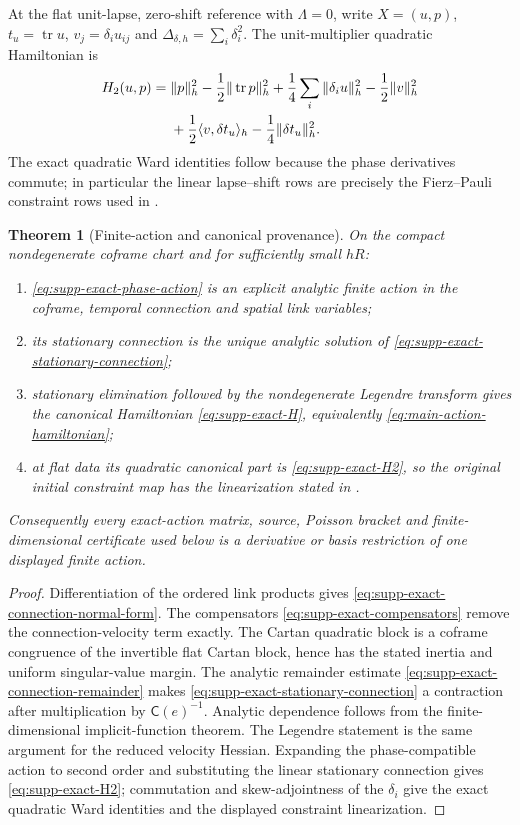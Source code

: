\documentclass[11pt]{article}
\newtheorem{theorem}{Theorem}[section]
\numberwithin{equation}{section}
\theoremstyle{definition}
\theoremstyle{remark}
\newcommand{\tr}{\operatorname{tr}}
\begin{document}
At the flat unit-lapse, zero-shift reference with $\Lambda=0$, write
$X=(u,p)$, $t_u=\tr u$, $v_j=\delta_i u_{ij}$ and
$\Delta_{\delta,h}=\sum_i\delta_i^2$.  The unit-multiplier quadratic
Hamiltonian is
\begin{align}
 H_2(u,p)={}&\|p\|_h^2-\frac12\|\tr p\|_h^2
 +\frac14\sum_i\|\delta_i u\|_h^2-\frac12\|v\|_h^2\notag\\
 &+\frac12\langle v,\delta t_u\rangle_h
 -\frac14\|\delta t_u\|_h^2.
 \label{eq:supp-exact-H2}
\end{align}
The exact quadratic Ward identities follow because the phase derivatives
commute; in particular the linear lapse--shift rows are precisely the
Fierz--Pauli constraint rows used in
.

\begin{theorem}[Finite-action and canonical provenance]
\label{thm:supp-exact-action-provenance}
On the compact nondegenerate coframe chart and for sufficiently small $hR$:
\begin{enumerate}[label=\textup{(\roman*)},leftmargin=2.8em]
\item \eqref{eq:supp-exact-phase-action} is an explicit analytic finite action
in the coframe, temporal connection and spatial link variables;
\item its stationary connection is the unique analytic solution of
\eqref{eq:supp-exact-stationary-connection};
\item stationary elimination followed by the nondegenerate Legendre transform
gives the canonical Hamiltonian \eqref{eq:supp-exact-H}, equivalently
\eqref{eq:main-action-hamiltonian};
\item at flat data its quadratic canonical part is
\eqref{eq:supp-exact-H2}, so the original initial constraint map has the
linearization stated in .
\end{enumerate}
Consequently every exact-action matrix, source, Poisson bracket and
finite-dimensional certificate used below is a derivative or basis
restriction of one displayed finite action.
\end{theorem}
\begin{proof}
Differentiation of the ordered link products gives
\eqref{eq:supp-exact-connection-normal-form}.  The compensators
\eqref{eq:supp-exact-compensators} remove the connection-velocity term exactly.
The Cartan quadratic block is a coframe congruence of the invertible flat
Cartan block, hence has the stated inertia and uniform singular-value margin.
The analytic remainder estimate
\eqref{eq:supp-exact-connection-remainder} makes
\eqref{eq:supp-exact-stationary-connection} a contraction after multiplication
by $\mathsf C(e)^{-1}$.  Analytic dependence follows from the finite-dimensional
implicit-function theorem.  The Legendre statement is the same argument for
the reduced velocity Hessian.  Expanding the phase-compatible action to
second order and substituting the linear stationary connection gives
\eqref{eq:supp-exact-H2}; commutation and skew-adjointness of the
$\delta_i$ give the exact quadratic Ward identities and the displayed
constraint linearization.
\end{proof}
\end{document}
